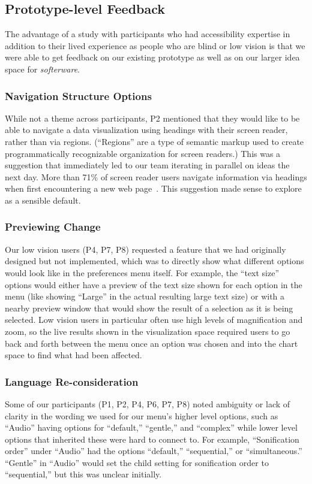 \documentclass[12pt]{cmuthesis}
\begin{document}
\subsection{Prototype-level Feedback}
The advantage of a study with participants who had accessibility expertise in addition to their lived experience as people who are blind or low vision is that we were able to get feedback on our existing prototype as well as on our larger idea space for \textit{softerware}.

\subsubsection{Navigation Structure Options}
While not a theme across participants, P2 mentioned that they would like to be able to navigate a data visualization using headings with their screen reader, rather than via regions. (``Regions'' are a type of semantic markup used to create programmatically recognizable organization for screen readers.) This was a suggestion that immediately led to our team iterating in parallel on ideas the next day. More than 71\% of screen reader users navigate information via headings when first encountering a new web page~\cite{WebAIM}. This suggestion made sense to explore as a sensible default.

\subsubsection{Previewing Change}
Our low vision users (P4, P7, P8) requested a feature that we had originally designed but not implemented, which was to directly show what different options would look like in the preferences menu itself. For example, the ``text size'' options would either have a preview of the text size shown for each option in the menu (like showing ``Large'' in the actual resulting large text size) or with a nearby preview window that would show the result of a selection as it is being selected. Low vision users in particular often use high levels of magnification and zoom, so the live results shown in the visualization space required users to go back and forth between the menu once an option was chosen and into the chart space to find what had been affected.

\subsubsection{Language Re-consideration}
Some of our participants (P1, P2, P4, P6, P7, P8) noted ambiguity or lack of clarity in the wording we used for our menu's higher level options, such as ``Audio'' having options for ``default,'' ``gentle,'' and ``complex'' while lower level options that inherited these were hard to connect to. For example, ``Sonification order'' under ``Audio'' had the options ``default,'' ``sequential,'' or ``simultaneous.'' ``Gentle'' in ``Audio'' would set the child setting for sonification order to ``sequential,'' but this was unclear initially.
\end{document}
